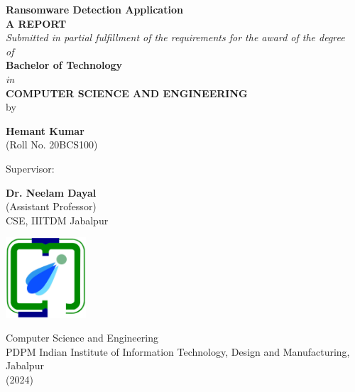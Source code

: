 \documentclass[12pt,letterpaper]{article}
\begin{document}
\begin{titlepage}
    \begin{center}
        \vspace*{0.5cm}
        
        \textbf{\LARGE Ransomware Detection Application} \\
         \large {\textbf{A REPORT} \\ \textit{Submitted in partial fulfillment of the requirements for the award of the degree \\ of}
        \\ \textbf{Bachelor of Technology} \\ \textit{in} \\ \textbf{COMPUTER SCIENCE AND ENGINEERING}} \\
        
        \Large by
        
        \textbf{\Large Hemant Kumar} \\
        (Roll No. 20BCS100)
        
        \vspace{0.8cm}
        
        \Large Supervisor:
        
        \textbf{\Large Dr. Neelam Dayal }\\
            (Assistant Professor) \\ CSE, IIITDM Jabalpur
        
        \vspace{0.8cm}
        
        
        
        \vfill
        
        \includegraphics[width=30mm]{images/logo_college copy.png}
        
        \vspace{0.5cm}
        
        \Large{Computer Science and Engineering 
        \\ PDPM Indian Institute of Information Technology, Design and Manufacturing, Jabalpur}
        \\ (2024)
        
    \end{center}
\end{titlepage}
\end{document}
